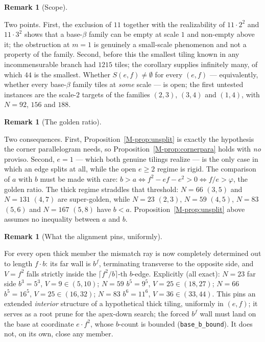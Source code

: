 \documentclass[11pt,reqno]{amsart}
\theoremstyle{plain}
\theoremstyle{definition}
\newtheorem{remark}[theorem]{Remark}
\begin{document}
\begin{remark}[Scope]\label{OM-ladder}

Two points. First, the exclusion of $11$ together with the realizability of $11\cdot2^2$ and
$11\cdot3^2$ shows that a base-$\beta$ family can be empty at scale $1$ and non-empty above it; the
obstruction at $m=1$ is genuinely a small-scale phenomenon and not a property of the family. Second,
before this the smallest tiling known in any incommensurable branch had $1215$ tiles; the corollary
supplies infinitely many, of which $44$ is the smallest. Whether $S(e,f)\ne\emptyset$ for every
$(e,f)$ --- equivalently, whether every base-$\beta$ family tiles at \emph{some} scale --- is open;
the first untested instances are the scale-$2$ targets of the families $(2,3)$, $(3,4)$ and $(1,4)$,
with $N=92$, $156$ and $188$.
\end{remark}

\begin{remark}[The golden ratio]\label{OM-golden}

Two consequences. First, Proposition~\ref{M-prop:unsplit} is exactly the hypothesis the corner
parallelogram needs, so Proposition~\ref{M-prop:cornerpara} holds with \emph{no} proviso. Second, $e=1$ --- which
both genuine tilings realize --- is the only case in which an edge splits at all, while the open
$e\ge2$ regime is rigid. The comparison of $a$ with $b$ must be made with care:
$b>a\iff f^2-ef-e^2>0\iff f/e>\varphi$, the golden ratio. The thick regime straddles that threshold:
$N=66$ $(3,5)$ and $N=131$ $(4,7)$ are super-golden, while $N=23$ $(2,3)$, $N=59$ $(4,5)$,
$N=83$ $(5,6)$ and $N=167$ $(5,8)$ have $b<a$. Proposition~\ref{M-prop:unsplit} above assumes no
inequality between $a$ and $b$.
\end{remark}

\begin{remark}[What the alignment pins, uniformly]\label{OM-align}

For every open thick member the mismatch ray is now completely determined out to length $f\cdot b$: its
far wall is $b^{f}$, terminating transverse to the opposite side, and $V=f^2$ falls strictly inside the
$\lceil f^2/b\rceil$-th $b$-edge. Explicitly (all exact): $N=23$ far side $b^3=5^3$, $V=9\in(5,10)$;
$N=59$ $b^5=9^5$, $V=25\in(18,27)$; $N=66$ $b^5=16^5$, $V=25\in(16,32)$; $N=83$ $b^6=11^6$,
$V=36\in(33,44)$. This pins an extended \emph{interior} structure of a
hypothetical thick tiling, uniformly in $(e,f)$; it serves as a root prune for the apex-down search; the forced $b^f$ wall must land on the base at
coordinate $e\cdot f^2$, whose $b$-count is bounded (\texttt{base\_b\_bound}). It does not, on its
own, close any member.
\end{remark}
\end{document}
